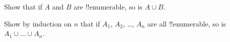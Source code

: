 \documentclass[../../../include/open-logic-section]{subfiles}
\begin{document}
\begin{prob}
Show that if $A$ and $B$ are !!{enumerable}, so is $A \cup B$.
\end{prob}

\begin{prob}
Show by induction on $n$ that if $A_1$, $A_2$, \dots, $A_n$ are all
!!{enumerable}, so is $A_1 \cup \dots \cup A_n$.
\end{prob}
\end{document}

